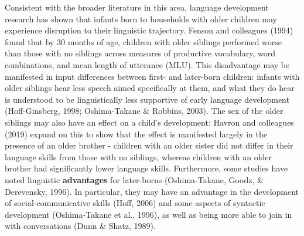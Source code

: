 \documentclass[
  english,
  man,floatsintext]{apa6}
\begin{document}
Consistent with the broader literature in this area, language development research has shown that infants born to households with older children may experience disruption to their linguistic trajectory. Fenson and colleagues (1994) found that by 30 months of age, children with older siblings performed worse than those with no siblings across measures of productive vocabulary, word combinations, and mean length of utterance (MLU). This disadvantage may be manifested in input differences between first- and later-born children: infants with older siblings hear less speech aimed specifically at them, and what they do hear is understood to be linguistically less supportive of early language development (Hoff-Ginsberg, 1998; Oshima-Takane \& Robbins, 2003). The sex of the older siblings may also have an effect on a child's development: Havron and colleagues (2019) expand on this to show that the effect is manifested largely in the presence of an older brother - children with an older sister did not differ in their language skills from those with no siblings, whereas children with an older brother had significantly lower language skills. Furthermore, some studies have noted linguistic \textbf{advantages} for later-borns (Oshima-Takane, Goodz, \& Derevensky, 1996). In particular, they may have an advantage in the development of social-communicative skills (Hoff, 2006) and some aspects of syntactic development (Oshima-Takane et al., 1996), as well as being more able to join in with conversations (Dunn \& Shatz, 1989).
\end{document}
